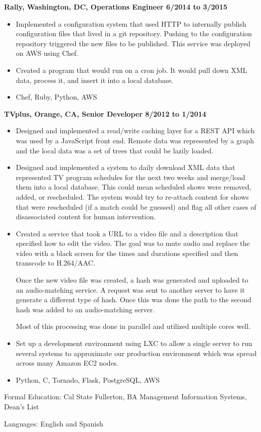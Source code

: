 \documentclass{res}
\begin{document}
\begin{resume}
  {\large \bf Rally, Washington, DC, Operations Engineer \hfill 6/2014 to 3/2015}

  \begin{itemize}

  \item
    Implemented a configuration system that used HTTP to
    internally publish configuration files that lived in a git repository.
    Pushing to the configuration repository triggered the new files
    to be published.  This service was deployed on AWS using Chef.
  \item
    Created a program that would run on a cron job.  It would pull down
    XML data, process it, and insert it into a local database.
  \item
    Chef, Ruby, Python, AWS
  \end{itemize}

  {\large \bf TVplus, Orange, CA, Senior Developer \hfill 8/2012 to 1/2014}

  \begin{itemize}

  \item
    Designed and implemented a read/write caching layer for a
    REST API which was used by a JavaScript front end.
    Remote data was represented by a graph and the
    local data was a set of trees that could be lazily loaded. 

  \item
    Designed and implemented a system to daily download XML data
    that represented TV program schedules for the next two weeks and
    merge/load them into a local database.  This could mean scheduled
    shows were removed, added, or rescheduled.  The system would try
    to re-attach content for shows that were rescheduled (if a match
    could be guessed) and flag all other cases of disassociated content
    for human intervention.

  \item
    Created a service that took a URL to a video file and a description
    that specified how to edit the video.  The goal was to mute audio
    and replace the video with a black screen for the times and durations
    specified and then transcode to H.264/AAC.

    Once the new video file was created, a hash was generated and uploaded
    to an audio-matching service. A request was sent to another server
    to have it generate a different type of hash.  Once this was done
    the path to the second hash was added to an audio-matching server.

    Most of this processing was done in parallel and utilized multiple cores
    well.

  \item
    Set up a development environment using LXC to allow a single server to
    run several systems to approximate our production environment which
    was spread across many Amazon EC2 nodes.
  \item
    Python, C, Tornado, Flask, PostgreSQL, AWS
  \end{itemize}
Formal Education: Cal State Fullerton, BA Management Information
Systems, Dean's List

Languages: English and Spanish
\end{resume}
\end{document}
